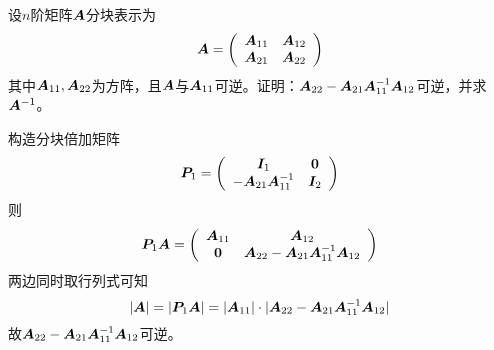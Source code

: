 \begin{li}
  设$n$阶矩阵$\A$分块表示为
  $$
  \A = \left(
    \begin{array}{cc}
      \A_{11} & \A_{12}\\
      \A_{21} & \A_{22}
    \end{array}
  \right)
  $$
  其中$\A_{11},\A_{22}$为方阵，且$\A$与$\A_{11}$可逆。证明：$\A_{22}-\A_{21}\A_{11}^{-1}\A_{12}$可逆，并求$\A^{-1}$。
\end{li}
\begin{jie}
  构造分块倍加矩阵
  $$
  \PP_1 = \left(
    \begin{array}{cc}
      \II_1 & \zero\\
      -\A_{21}\A_{11}^{-1} & \II_2
    \end{array}
  \right)
  $$
  则$$
  \PP_1\A = \left(
    \begin{array}{cc}
      \A_{11} & \A_{12} \\
      \zero & \A_{22}-\A_{21}\A_{11}^{-1}\A_{12}
    \end{array}
  \right)
  $$
  两边同时取行列式可知
  $$
  |\A| = |\PP_1\A| = |\A_{11}|\cdot |\A_{22}-\A_{21}\A_{11}^{-1}\A_{12}|
  $$
  故$\A_{22}-\A_{21}\A_{11}^{-1}\A_{12}$可逆。






\end{jie}
